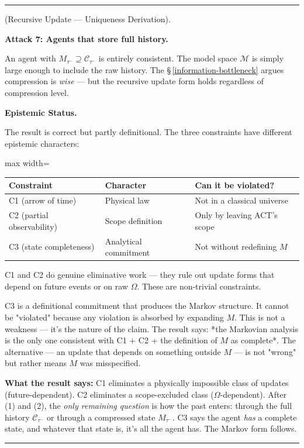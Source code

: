 \documentclass[11pt,oneside]{article}
\newcounter{claim}[section]
\renewcommand{\theclaim}{\thesection.\arabic{claim}}
\newenvironment{segment}[2]{%
  \refstepcounter{claim}%
  \bigskip\noindent\hrule\smallskip
  \noindent{\bfseries #1~\theclaim}\enskip(#2).\par\smallskip
  \noindent\ignorespaces
}{%
  \par\smallskip\noindent\hrule\bigskip
}
\newenvironment{derivation}[1][]{\begin{segment}{Derivation}{#1}}{\end{segment}}
\begin{document}
\begin{derivation}[Recursive Update — Uniqueness Derivation]
\medskip\noindent\textbf{Attack 7: Agents that store full history.}


An agent with $M_{\tau^-} \supseteq \mathcal{C}_{\tau^-}$ is entirely consistent. The model space $\mathcal{M}$ is simply large enough to include the raw history. The \S\,\ref{information-bottleneck} argues compression is \textit{wise} — but the recursive update form holds regardless of compression level.


\medskip\noindent\textbf{Epistemic Status.}


The result is correct but partly definitional. The three constraints have different epistemic characters:

\begin{adjustbox}{max width=\textwidth}
\small
\begin{tabular}{lll}
\toprule
Constraint & Character & Can it be violated? \\
\midrule
C1 (arrow of time) & Physical law & Not in a classical universe \\
C2 (partial observability) & Scope definition & Only by leaving ACT's scope \\
C3 (state completeness) & Analytical commitment & Not without redefining $M$ \\
\bottomrule
\end{tabular}
\end{adjustbox}


C1 and C2 do genuine eliminative work — they rule out update forms that depend on future events or on raw $\Omega$. These are non-trivial constraints.

C3 is a definitional commitment that produces the Markov structure. It cannot be "violated" because any violation is absorbed by expanding $M$. This is not a weakness — it's the nature of the claim. The result says: *the Markovian analysis is the only one consistent with C1 + C2 + the definition of $M$ as complete*. The alternative — an update that depends on something outside $M$ — is not "wrong" but rather means $M$ was misspecified.

\textbf{What the result says:} C1 eliminates a physically impossible class of updates (future-dependent). C2 eliminates a scope-excluded class ($\Omega$-dependent). After (1) and (2), the \textit{only remaining question} is how the past enters: through the full history $\mathcal{C}_{\tau^-}$ or through a compressed state $M_{\tau^-}$. C3 says the agent \textit{has} a complete state, and whatever that state is, it's all the agent has. The Markov form follows.


\end{derivation}
\end{document}
